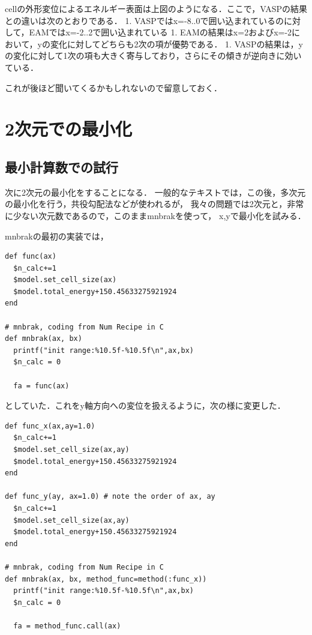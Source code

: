     cellの外形変位によるエネルギー表面は上図のようになる．ここで，VASPの結果との違いは次のとおりである．
1.
VASPではx=-8..0で囲い込まれているのに対して，EAMではx=-2..2で囲い込まれている
1.
EAMの結果はx=2およびx=-2において，yの変化に対してどちらも2次の項が優勢である．
1.
VASPの結果は，yの変化に対して1次の項も大きく寄与しており，さらにその傾きが逆向きに効いている．

これが後ほど聞いてくるかもしれないので留意しておく．

    \section{2次元での最小化}\label{ux6b21ux5143ux3067ux306eux6700ux5c0fux5316}

\subsection{最小計算数での試行}\label{ux6700ux5c0fux8a08ux7b97ux6570ux3067ux306eux8a66ux884c}

次に2次元の最小化をすることになる．
一般的なテキストでは，この後，多次元の最小化を行う，共役勾配法などが使われるが，
我々の問題では2次元と，非常に少ない次元数であるので，このままmnbrakを使って，
x,yで最小化を試みる．

mnbrakの最初の実装では，

\begin{verbatim}
def func(ax)
  $n_calc+=1
  $model.set_cell_size(ax)
  $model.total_energy+150.45633275921924
end

# mnbrak, coding from Num Recipe in C
def mnbrak(ax, bx)
  printf("init range:%10.5f-%10.5f\n",ax,bx)
  $n_calc = 0

  fa = func(ax)
\end{verbatim}

としていた．これをy軸方向への変位を扱えるように，次の様に変更した．

\begin{verbatim}
def func_x(ax,ay=1.0)
  $n_calc+=1
  $model.set_cell_size(ax,ay)
  $model.total_energy+150.45633275921924
end

def func_y(ay, ax=1.0) # note the order of ax, ay 
  $n_calc+=1
  $model.set_cell_size(ax,ay)
  $model.total_energy+150.45633275921924
end

# mnbrak, coding from Num Recipe in C
def mnbrak(ax, bx, method_func=method(:func_x))
  printf("init range:%10.5f-%10.5f\n",ax,bx)
  $n_calc = 0

  fa = method_func.call(ax)
\end{verbatim}

